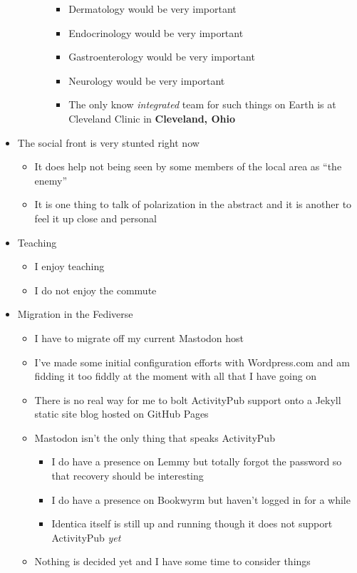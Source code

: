 \begin{itemize}
\begin{itemize}
\begin{itemize}
      \begin{itemize}
      \tightlist
      \item
        Dermatology would be very important
      \item
        Endocrinology would be very important
      \item
        Gastroenterology would be very important
      \item
        Neurology would be very important
      \item
        The only know \emph{integrated} team for such things on Earth is
        at Cleveland Clinic in \textbf{Cleveland, Ohio}
      \end{itemize}
    \end{itemize}
  \end{itemize}
\item
  The social front is very stunted right now

  \begin{itemize}
  \tightlist
  \item
    It does help not being seen by some members of the local area as
    ``the enemy''
  \item
    It is one thing to talk of polarization in the abstract and it is
    another to feel it up close and personal
  \end{itemize}
\item
  Teaching

  \begin{itemize}
  \tightlist
  \item
    I enjoy teaching
  \item
    I do not enjoy the commute
  \end{itemize}
\item
  Migration in the Fediverse

  \begin{itemize}
  \tightlist
  \item
    I have to migrate off my current Mastodon host
  \item
    I've made some initial configuration efforts with Wordpress.com and
    am fidding it too fiddly at the moment with all that I have going on
  \item
    There is no real way for me to bolt ActivityPub support onto a
    Jekyll static site blog hosted on GitHub Pages
  \item
    Mastodon isn't the only thing that speaks ActivityPub

    \begin{itemize}
    \tightlist
    \item
      I do have a presence on Lemmy but totally forgot the password so
      that recovery should be interesting
    \item
      I do have a presence on Bookwyrm but haven't logged in for a while
    \item
      Identica itself is still up and running though it does not support
      ActivityPub \emph{yet}
    \end{itemize}
  \item
    Nothing is decided yet and I have some time to consider things
  \end{itemize}
\end{itemize}
